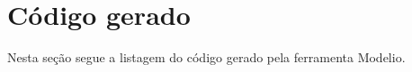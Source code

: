 \section{Código gerado}

Nesta seção segue a listagem do código gerado pela ferramenta Modelio.
\newline

